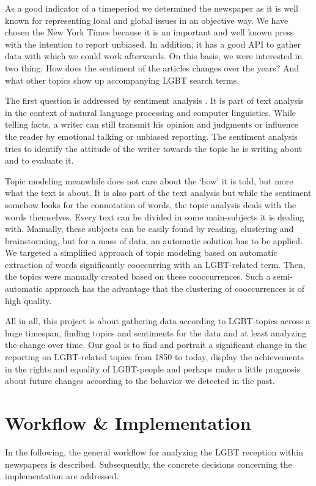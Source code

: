 \documentclass[10pt,a4paper,twocolumn]{scrartcl}
\begin{document}
As a good indicator of a timeperiod we determined the newspaper as it is well known for representing local and global issues in an objective way. We have chosen the New York Times because it is an important and well known press with the intention to report unbiased. In addition, it has a good API to gather data with which we could work afterwards. On this basis, we were interested in two thing: How does the sentiment of the articles changes over the years? And what other topics show up accompanying LGBT search terms.

The first question is addressed by sentiment analysis \citep{Nasukawa+Yi:2003, Godbole+al:2007, Cambria+al:2013}. It is part of text analysis in the context of natural language processing and computer linguistics. While telling facts, a writer can still transmit his opinion and judgments or influence the reader by emotional talking or unbiased reporting. The sentiment analysis tries to identify the attitude of the writer towards the topic he is writing about and to evaluate it.

Topic modeling \citep{Wallach:2006, Blei:2012} meanwhile does not care about the `how' it is told, but more what the text is about. It is also part of the text analysis but while the sentiment somehow looks for the connotation of words, the topic analysis deals with the words themselves. Every text can be divided in some main-subjects it is dealing with. Manually, these subjects can be easily found by reading, clustering and brainstorming, but for a mass of data, an automatic solution has to be applied. We targeted a simplified approach of topic modeling based on automatic extraction of words significantly cooccurring with an LGBT-related term. Then, the topics were manually created based on these cooccurrences. Such a semi-automatic approach has the advantage that the clustering of cooccurrences is of high quality.

All in all, this project is about gathering data according to LGBT-topics across a huge timespan, finding topics and sentiments for the data and at least analyzing the change over time. Our goal is to find and portrait a significant change in the reporting on LGBT-related topics from 1850 to today, display the achievements in the rights and equality of LGBT-people and perhaps make a little prognosis about future changes according to the behavior we detected in the past. 

\section{Workflow \& Implementation}
In the following, the general workflow for analyzing the LGBT reception within newspapers is described. Subsequently, the concrete decisions concerning the implementation are addressed.
\end{document}
